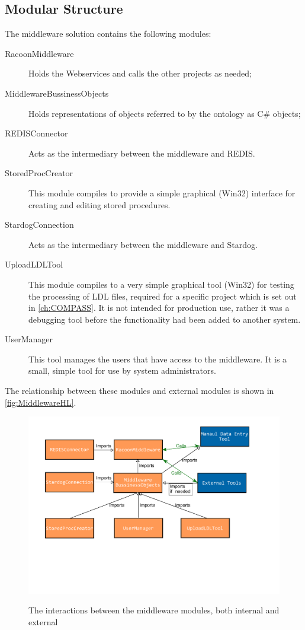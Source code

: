 \subsection{Modular Structure}
The middleware solution contains the following modules:
\begin{description}
    \item[RacoonMiddleware] Holds the Webservices and calls the other projects as needed;
    \item[MiddlewareBussinessObjects] Holds representations of objects referred to by the ontology as C\# objects;     
    \item[REDISConnector] Acts as the intermediary between the middleware and REDIS.
    \item[StoredProcCreator]
    This module compiles to provide a simple graphical (Win32) interface for creating and editing stored procedures. 
    \item[StardogConnection]  Acts as the intermediary between the middleware and Stardog.    
    \item[UploadLDLTool]
    This module compiles to a very simple graphical tool (Win32) for testing the processing of LDL files, required for a specific project which is set out in  \autoref{ch:COMPASS}. It is not intended for production use, rather it was a debugging tool before the functionality had been added to another system.
    \item[UserManager]
    This tool manages the users that have access to the middleware. It is a small, simple tool for use by system administrators.
\end{description}

The relationship between these modules and external modules is shown in \autoref{fig:MiddlewareHL}.

\begin{figure}[H]
\myfloatalign
{\includegraphics[width=\linewidth]{gfx/MiddlewareHighLevel}} 
\caption{The interactions between the middleware modules, both internal and external}
\label{fig:MiddlewareHL}
\end{figure}

